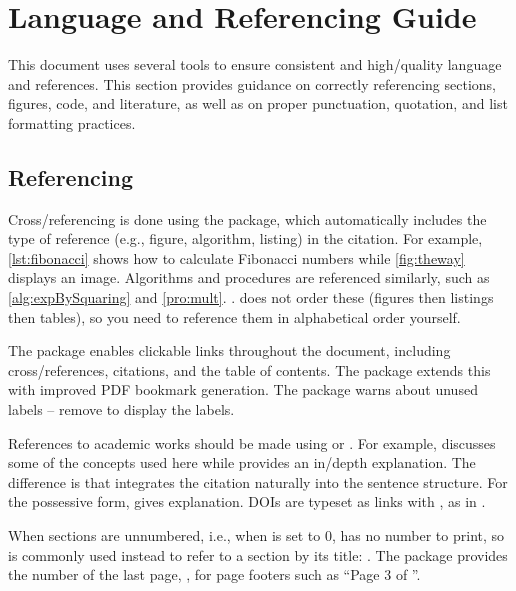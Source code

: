 \section{Language and Referencing Guide}

This document uses several tools to ensure consistent and high\-/quality language and references. This section provides guidance on correctly referencing sections, figures, code, and literature, as well as on proper punctuation, quotation, and list formatting practices.

\subsection{Referencing}

Cross\-/referencing is done using the  package, which automatically includes the type of reference (e.g., figure, algorithm, listing) in the citation. For example, \cref{lst:fibonacci} shows how to calculate Fibonacci numbers while \cref{fig:theway} displays an image. Algorithms and procedures are referenced similarly, such as \cref{alg:expBySquaring} and \cref{pro:mult}. .  does not order these (figures then listings then tables), so you need to reference them in alphabetical order yourself.

The  package enables clickable links throughout the document, including cross\-/references, citations, and the table of contents. The  package extends this with improved PDF bookmark generation. The  package warns about unused labels \--- remove  to display the labels.

References to academic works should be made using \latexinline{\cite} or \latexinline{\textcite}. For example, \cite{xx00} discusses some of the concepts used here while \textcite{xx00} provides an in\-/depth explanation. The difference is that \latexinline{\textcite} integrates the citation naturally into the sentence structure. For the possessive form, \latexinline{\textscite} gives  explanation. DOIs are typeset as links with \latexinline{\doi}, as in .

When sections are unnumbered, i.e., when  is set to \num{0}, \latexinline{\cref} has no number to print, so \latexinline{\nameref} is commonly used instead to refer to a section by its title: . The  package provides the number of the last page, \pageref{LastPage}, for page footers such as \enquote{Page 3 of \pageref{LastPage}}.

